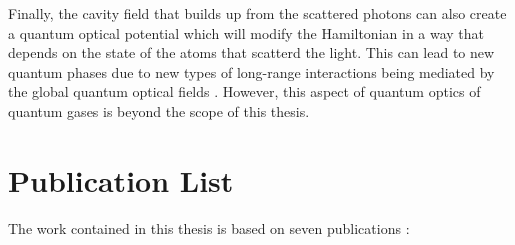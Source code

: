 Finally, the cavity field that builds up from the scattered photons
can also create a quantum optical potential which will modify the
Hamiltonian in a way that depends on the state of the atoms that
scatterd the light. This can lead to new quantum phases due to new
types of long-range interactions being mediated by the global quantum
optical fields \cite{caballero2015, caballero2015njp, caballero2016,
  caballero2016a, elliott2016}. However, this aspect of quantum optics
of quantum gases is beyond the scope of this thesis.

\newpage

\section*{Publication List}

The work contained in this thesis is based on seven publications
\cite{kozlowski2015, elliott2015, atoms2015, mazzucchi2016,
  kozlowski2016zeno, mazzucchi2016njp, kozlowski2016phase}:

